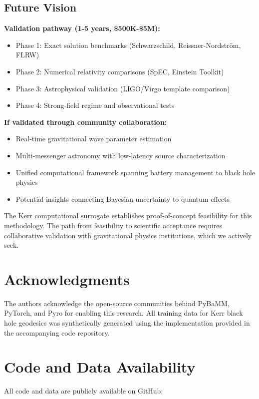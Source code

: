 \documentclass[11pt,a4paper]{article}
\begin{document}
\subsection{Future Vision}

\textbf{Validation pathway (1-5 years, \$500K-\$5M):}
\begin{itemize}
\item Phase 1: Exact solution benchmarks (Schwarzschild, Reissner-Nordström, FLRW)
\item Phase 2: Numerical relativity comparisons (SpEC, Einstein Toolkit)
\item Phase 3: Astrophysical validation (LIGO/Virgo template comparison)
\item Phase 4: Strong-field regime and observational tests
\end{itemize}

\textbf{If validated through community collaboration:}
\begin{itemize}
\item Real-time gravitational wave parameter estimation
\item Multi-messenger astronomy with low-latency source characterization
\item Unified computational framework spanning battery management to black hole physics
\item Potential insights connecting Bayesian uncertainty to quantum effects
\end{itemize}

The Kerr computational surrogate establishes proof-of-concept feasibility for this methodology. The path from feasibility to scientific acceptance requires collaborative validation with gravitational physics institutions, which we actively seek.

\section*{Acknowledgments}

The authors acknowledge the open-source communities behind PyBaMM, PyTorch, and Pyro for enabling this research. All training data for Kerr black hole geodesics was synthetically generated using the implementation provided in the accompanying code repository.

\section*{Code and Data Availability}

All code and data are publicly available on GitHub:
\end{document}
